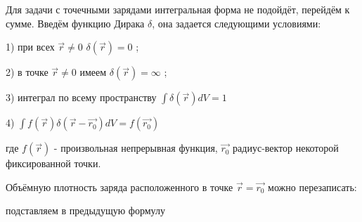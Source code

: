 Для задачи с точечными зарядами интегральная форма не подойдёт, перейдём к
сумме. Введём функцию Дирака $\delta$, она задается следующими условиями:

1) при всех $\vec{r} \neq 0$ $\delta(\vec{r})=0$ ;

2) в точке $\vec{r}\neq 0$ имеем $\delta(\vec{r})=\infty$ ;

3) интеграл по всему пространству $\int\delta(\vec{r})dV=1$

4) $\int f(\vec{r})\delta(\vec{r}-\vec{r_0})dV=f(\vec{r_0})$

где $f(\vec{r})$ - произвольная непрерывная функция, $\vec{r_0}$
радиус-вектор некоторой фиксированной точки.

Объёмную плотность заряда расположенного в точке $\vec{r}=\vec{r_0}$ можно
перезаписать:

подставляем в предыдущую формулу



